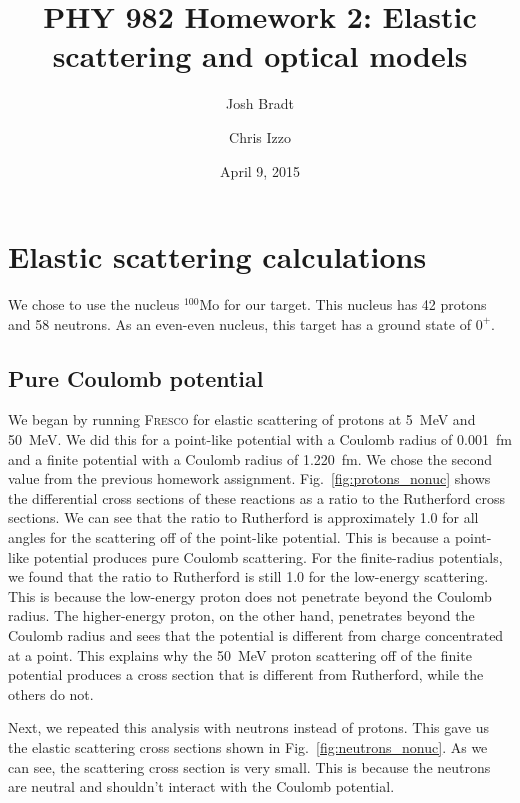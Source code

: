 \documentclass[aps, prc, twocolumn, reprint]{revtex4-1}
\newcommand{\nuc}[2]{${}^{#1}\text{#2}$}
\newcommand{\fresco}[0]{\textsc{Fresco}\xspace}
\begin{document}
\title{PHY 982 Homework 2: Elastic scattering and optical models}
\author{Josh Bradt}
\author{Chris Izzo}
\date{April 9, 2015}

\maketitle

\section{Elastic scattering calculations}

	We chose to use the nucleus \nuc{100}{Mo} for our target. This nucleus has 42 protons and 58 neutrons. As an even-even nucleus, this target has a ground state of $0^+$.

	\subsection{Pure Coulomb potential}

	We began by running \fresco for elastic scattering of protons at \SI{5}{MeV} and \SI{50}{MeV}. We did this for a point-like potential with a Coulomb radius of \SI{0.001}{fm} and a finite potential with a Coulomb radius of \SI{1.220}{fm}. We chose the second value from the previous homework assignment. Fig.~\ref{fig:protons_nonuc} shows the differential cross sections of these reactions as a ratio to the Rutherford cross sections. We can see that the ratio to Rutherford is approximately 1.0 for all angles for the scattering off of the point-like potential. This is because a point-like potential produces pure Coulomb scattering. For the finite-radius potentials, we found that the ratio to Rutherford is still 1.0 for the low-energy scattering. This is because the low-energy proton does not penetrate beyond the Coulomb radius. The higher-energy proton, on the other hand, penetrates beyond the Coulomb radius and sees that the potential is different from charge concentrated at a point. This explains why the \SI{50}{MeV} proton scattering off of the finite potential produces a cross section that is different from Rutherford, while the others do not.

	Next, we repeated this analysis with neutrons instead of protons. This gave us the elastic scattering cross sections shown in Fig.~\ref{fig:neutrons_nonuc}. As we can see, the scattering cross section is very small. This is because the neutrons are neutral and shouldn't interact with the Coulomb potential. 
\end{document}
